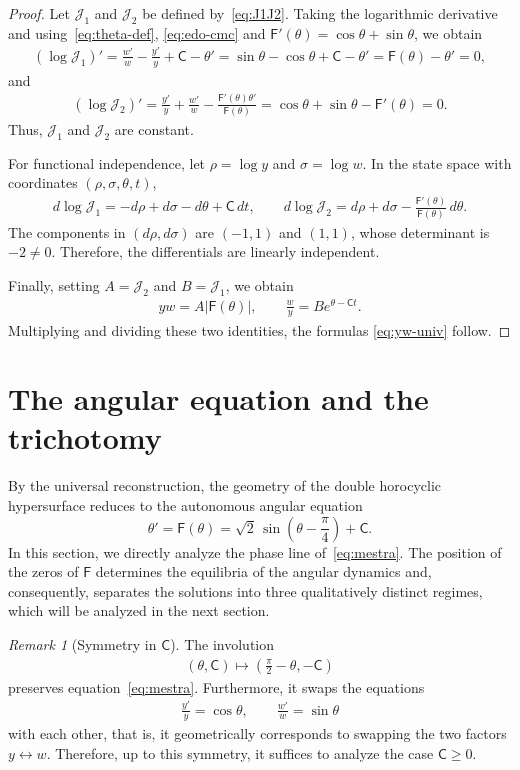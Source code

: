 \documentclass[11pt,a4paper]{amsart}
\theoremstyle{plain}
\theoremstyle{remark}
\newtheorem{remark}[remark]{Remark} \aliascntresetthe{remark}
\newcommand{\C}{\mathsf{C}}
\newcommand{\F}{\mathsf{F}}
\newcommand{\J}{\mathcal{J}}
\begin{document}
\begin{proof}
Let $\J_1$ and $\J_2$ be defined by~\eqref{eq:J1J2}.
Taking the logarithmic derivative and using~\eqref{eq:theta-def},
\eqref{eq:edo-cmc} and $\F'(\theta)=\cos\theta+\sin\theta$, we obtain
\begin{align*}
(\log\J_1)'
=
\frac{w'}w-\frac{y'}y+\C-\theta'
=
\sin\theta-\cos\theta+\C-\theta'
=
\F(\theta)-\theta'
=
0,
\end{align*}
and
\begin{align*}
(\log\J_2)'
=
\frac{y'}y+\frac{w'}w-\frac{\F'(\theta)\theta'}{\F(\theta)}
=
\cos\theta+\sin\theta-\F'(\theta)
=
0.
\end{align*}
Thus, $\J_1$ and $\J_2$ are constant.

For functional independence, let $\rho=\log y$ and $\sigma=\log w$.
In the state space with coordinates $(\rho,\sigma,\theta,t)$,
\begin{align*}
d\log\J_1
=
-d\rho+d\sigma-d\theta+\C\,dt,
\qquad
d\log\J_2
=
d\rho+d\sigma-\frac{\F'(\theta)}{\F(\theta)}\,d\theta.
\end{align*}
The components in $(d\rho,d\sigma)$ are $(-1,1)$ and $(1,1)$, whose
determinant is $-2\neq0$. Therefore, the differentials are linearly
independent.

Finally, setting $A=\J_2$ and $B=\J_1$, we obtain
\begin{align*}
yw=A|\F(\theta)|,
\qquad
\frac wy=B e^{\theta-\C t}.
\end{align*}
Multiplying and dividing these two identities, the formulas
\eqref{eq:yw-univ} follow.
\end{proof}
\section{The angular equation and the trichotomy}
\label{sec:fase}

By the universal reconstruction, the geometry of the double horocyclic
hypersurface reduces to the autonomous angular equation
\begin{equation}\label{eq:mestra}
\theta'=\F(\theta)
=
\sqrt2\,\sin\!\left(\theta-\frac\pi4\right)+\C.
\end{equation}
In this section, we directly analyze the phase line of~\eqref{eq:mestra}. The
position of the zeros of $\F$ determines the equilibria of the angular dynamics
and, consequently, separates the solutions into three qualitatively distinct
regimes, which will be analyzed in the next section.

\begin{remark}[Symmetry in $\C$]\label{rmk:simetria}
The involution
\begin{align*}
(\theta,\C)\longmapsto \left(\frac\pi2-\theta,-\C\right)
\end{align*}
preserves equation~\eqref{eq:mestra}. Furthermore, it swaps the equations
\begin{align*}
\frac{y'}y=\cos\theta,
\qquad
\frac{w'}w=\sin\theta
\end{align*}
with each other, that is, it geometrically corresponds to swapping the two
factors $y\leftrightarrow w$. Therefore, up to this symmetry, it suffices to
analyze the case $\C\ge0$.
\end{remark}
\end{document}

